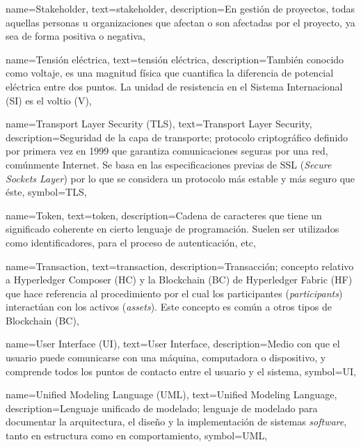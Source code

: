 {
    name={Stakeholder},
    text={stakeholder},
    description={En gestión de proyectos, todas aquellas personas u organizaciones que afectan o son afectadas por el proyecto, ya sea de forma positiva o negativa},
}

{
    name={Tensión eléctrica},
    text={tensión eléctrica},
    description={También conocido como voltaje, es una magnitud física que cuantifica la diferencia de potencial eléctrica entre dos puntos.​ La unidad de resistencia en el Sistema Internacional (SI) es el voltio (V)},
}

{
    name={Transport Layer Security (TLS)},
    text={Transport Layer Security},
    description={Seguridad de la capa de transporte; protocolo criptográfico definido por primera vez en 1999 que garantiza comunicaciones seguras por una red, comúnmente Internet. Se basa en las especificaciones previas de SSL (\textit{Secure Sockets Layer}) por lo que se considera un protocolo más estable y más seguro que éste},
    symbol={TLS},
}

{
    name={Token},
    text={token},
    description={Cadena de caracteres que tiene un significado coherente en cierto lenguaje de programación. Suelen ser utilizados como identificadores, para el proceso de autenticación, etc},
}

{
    name={Transaction},
    text={transaction},
    description={Transacción; concepto relativo a Hyperledger Composer (HC) y la Blockchain (BC) de Hyperledger Fabric (HF) que hace referencia al procedimiento por el cual los participantes (\textit{participants}) interactúan con los activos (\textit{assets}). Este concepto es común a otros tipos de Blockchain (BC)},
}

{
    name={User Interface (UI)},
    text={User Interface},
    description={Medio con que el usuario puede comunicarse con una máquina, computadora o dispositivo, y comprende todos los puntos de contacto entre el usuario y el sistema},
    symbol={UI},
}

{
    name={Unified Modeling Language (UML)},
    text={Unified Modeling Language},
    description={Lenguaje unificado de modelado; lenguaje de modelado para documentar la arquitectura, el diseño y la implementación de sistemas \textit{software}, tanto en estructura como en comportamiento},
    symbol={UML},
}

